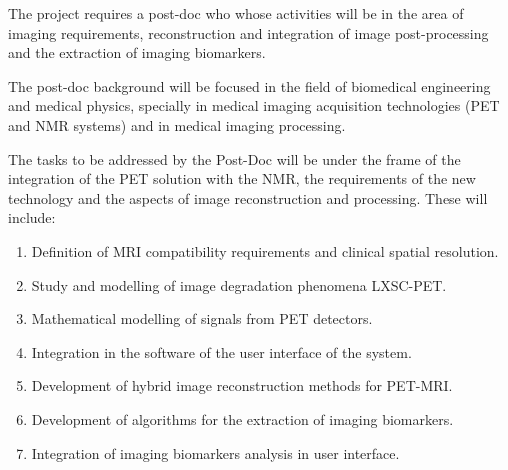  The project requires a post-doc who whose activities will be in the area of imaging requirements, reconstruction and integration of image post-processing and the extraction of imaging biomarkers.
 
The post-doc background will be focused in the field of biomedical engineering and medical physics, specially in medical imaging acquisition technologies (PET and NMR systems) and in medical imaging processing.
 
The tasks to be addressed by the Post-Doc will be under the frame of the integration of the PET solution with the NMR, the requirements of the new technology and the aspects of image reconstruction and processing. These will include:
 \begin{enumerate}
\item Definition of MRI compatibility requirements and clinical spatial resolution.
\item Study and modelling of image degradation phenomena LXSC-PET.
\item Mathematical modelling of signals from PET detectors.
\item Integration in the software of the user interface of the system.
\item Development of hybrid image reconstruction methods for PET-MRI.
\item Development of algorithms for the extraction of imaging biomarkers.
\item Integration of imaging biomarkers analysis in user interface.
\end{enumerate}
